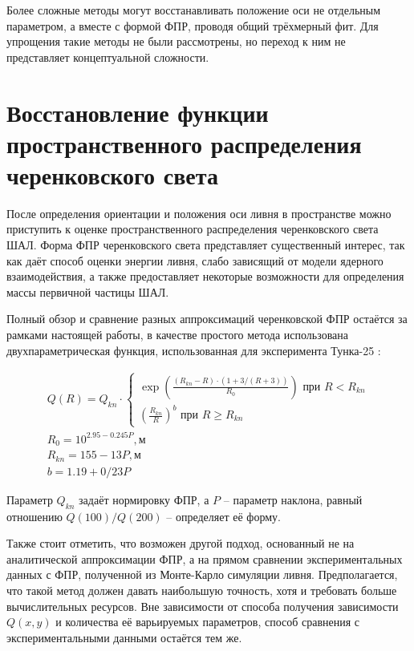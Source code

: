 Более сложные методы могут восстанавливать положение оси не отдельным параметром, а вместе с формой ФПР, проводя общий трёхмерный фит. Для упрощения такие методы не были рассмотрены, но переход к ним не представляет концептуальной сложности.

\section{Восстановление функции пространственного распределения черенковского света}

После определения ориентации и положения оси ливня в пространстве можно приступить к оценке пространственного распределения черенковского света ШАЛ. Форма ФПР черенковского света представляет существенный интерес, так как даёт способ оценки энергии ливня, слабо зависящий от модели ядерного взаимодействия, а также предоставляет некоторые возможности для определения массы первичной частицы ШАЛ.

Полный обзор и сравнение разных аппроксимаций черенковской ФПР остаётся за рамками настоящей работы, в качестве простого метода использована двухпараметрическая функция, использованная для эксперимента Тунка-25 \cite{Budnev2005}:

\begin{equation}
	\label{eq:tunka-25-ldf}
	\begin{gathered}
	Q(R) = Q_{kn} \cdot \begin{cases}
		\exp \left( \frac{(R_{kn} - R) \cdot (1 + 3/(R+3))}{R_0} \right) \text{ при } R < R_{kn} \\
		\left(\frac{R_{kn}}{R}\right)^b \text{ при } R \geq R_{kn} 
	\end{cases} \\
	R_0 = 10^{2.95 - 0.245 P}, \text{м}  \\
	R_{kn} = 155 - 13P, \text{м} \\
	b = 1.19 + 0/23 P
	\end{gathered}
\end{equation}

Параметр $Q_{kn}$ задаёт нормировку ФПР, а $P$ -- параметр наклона, равный отношению $Q(100)/Q(200)$ -- определяет её форму.

Также стоит отметить, что возможен другой подход, основанный не на аналитической аппроксимации ФПР, а на прямом сравнении экспериментальных данных с ФПР, полученной из Монте-Карло симуляции ливня. Предполагается, что такой метод должен давать наибольшую точность, хотя и требовать больше вычислительных ресурсов. Вне зависимости от способа получения зависимости $Q(x, y)$ и количества её варьируемых параметров, способ сравнения с экспериментальными данными остаётся тем же.

